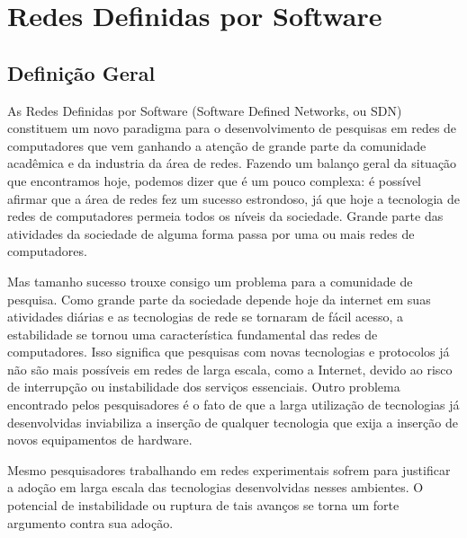 \chapter{Redes Definidas por Software}

\section{Definição Geral} As Redes Definidas
por Software (Software Defined Networks, ou SDN) constituem
um novo paradigma para o desenvolvimento de pesquisas em
redes de computadores que vem ganhando a atenção de grande
parte da comunidade acadêmica e da industria da área de
redes. Fazendo um balanço geral da situação que encontramos
hoje, podemos dizer que é um pouco complexa: é possível afirmar
que a área de redes fez um sucesso estrondoso, já que hoje a
tecnologia de redes de computadores permeia todos os níveis
da sociedade. Grande parte das atividades da sociedade de
alguma forma passa por uma ou mais redes de computadores.

Mas tamanho sucesso trouxe consigo um problema para a comunidade
de pesquisa. Como grande parte da sociedade depende hoje da
internet em suas atividades diárias e as tecnologias de rede
se tornaram de fácil acesso, a estabilidade se tornou uma
característica fundamental das redes de computadores. Isso
significa que pesquisas com novas tecnologias e protocolos
já não são mais possíveis em redes de larga escala, como a
Internet, devido ao risco de interrupção ou instabilidade
dos serviços essenciais. Outro problema encontrado pelos
pesquisadores é o fato de que a larga utilização de
tecnologias já desenvolvidas inviabiliza a inserção de
qualquer tecnologia que exija a inserção de novos
equipamentos de hardware.

Mesmo pesquisadores trabalhando em redes experimentais sofrem
para justificar a adoção em larga escala das tecnologias
desenvolvidas nesses ambientes. O potencial de instabilidade
ou ruptura de tais avanços se torna um forte argumento
contra sua adoção.

